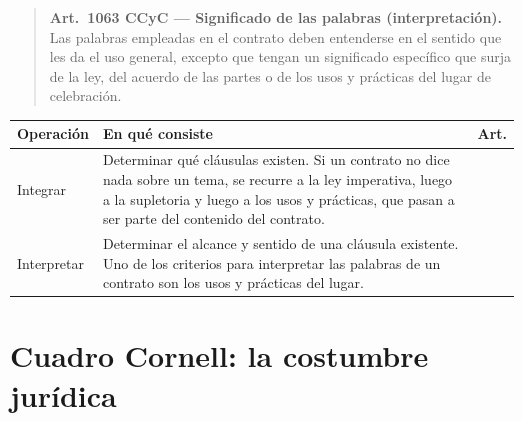 \documentclass[12pt,oneside]{book}
\begin{document}
\begin{quote}
\textbf{Art.~1063 CCyC --- Significado de las palabras (interpretación).} Las palabras empleadas en el contrato deben entenderse en el sentido que les da el uso general, excepto que tengan un significado específico que surja de la ley, del acuerdo de las partes o de los usos y prácticas del lugar de celebración.
\end{quote}

\begin{table}[H]
\centering
\begin{tabularx}{\textwidth}{>{\raggedright\arraybackslash}p{} >{\raggedright\arraybackslash}X >{\raggedright\arraybackslash}p{}}
\toprule
\textbf{Operación} & \textbf{En qué consiste} & \textbf{Art.} \\
\midrule
Integrar & Determinar qué cláusulas existen. Si un contrato no dice nada sobre un tema, se recurre a la ley imperativa, luego a la supletoria y luego a los usos y prácticas, que pasan a ser parte del contenido del contrato. & 964 \\
\addlinespace
Interpretar & Determinar el alcance y sentido de una cláusula existente. Uno de los criterios para interpretar las palabras de un contrato son los usos y prácticas del lugar. & 1063 \\
\bottomrule
\end{tabularx}
\end{table}

\section{Cuadro Cornell: la costumbre jurídica}
\end{document}
